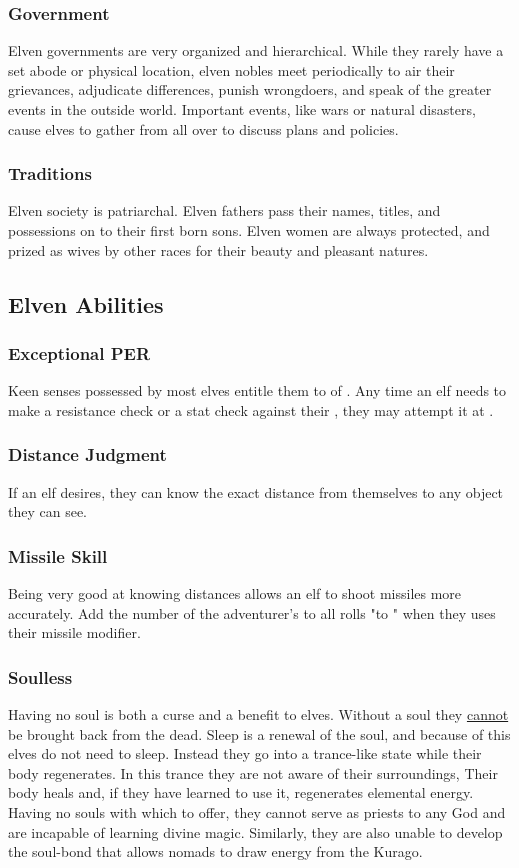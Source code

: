 \begin{multicols*}{2}
\subsubsection{Government}
Elven governments are very organized and hierarchical. While they rarely have a set abode or physical location, elven nobles meet periodically to air their grievances, adjudicate differences, punish wrongdoers, and speak of the greater events in the outside world. Important events, like wars or natural disasters, cause elves to gather from all over to discuss plans and policies.
\subsubsection{Traditions}
Elven society is patriarchal. Elven fathers pass their names, titles, and possessions on to their first born sons. Elven women are always protected, and prized as wives by other races for their beauty and pleasant natures.
\subsection{Elven Abilities}
\subsubsection{Exceptional PER}
Keen senses possessed by most elves entitle them to  of . Any time an elf needs to make a resistance check or a stat check against their \PER, they may attempt it at .
\subsubsection{Distance Judgment}
If an elf desires, they can know the exact distance from themselves to any object they can see.
\subsubsection{Missile Skill}
Being very good at knowing distances allows an elf to shoot missiles more accurately. Add the number of the adventurer's  to all rolls "to " when they uses their missile modifier.
\subsubsection{Soulless}
Having no soul is both a curse and a benefit to elves. Without a soul they \ul{cannot} be brought back from the dead. Sleep is a renewal of the soul, and because of this elves
do not need to sleep. Instead they go into a trance-like state while their body regenerates. In this trance they are not aware of their surroundings, Their body heals and, if they have learned to use it, regenerates elemental energy. Having no souls with which to offer, they cannot serve as priests to any God and are incapable of learning divine magic. Similarly, they are also unable to develop the soul-bond that allows nomads to draw energy from the Kurago.


\end{multicols*}
